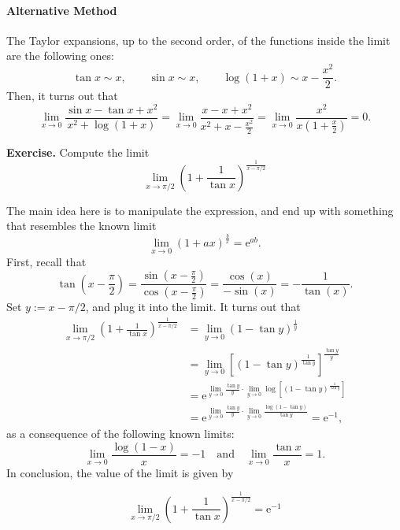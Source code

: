 \documentclass[a4paper,10 pt]{report}
\newcommand{\finalanswer}[1]{%
    \begin{finalAnswer}
    \[
        #1
    \]
    \end{finalAnswer}
}
\theoremstyle{definition}
\begin{document}
\begin{solutionBox}
\paragraph{Alternative Method} The Taylor expansions, up to the second order, of the functions inside the limit are the following ones:
\begin{equation*}  \tan x \sim x, \qquad \sin x \sim x, \qquad  \log(1 + x) \sim x - \frac{x^2}{2}. \end{equation*}
Then, it turns out that
\begin{equation*}  \lim_{x \to 0} \frac{\sin x - \tan x + x^2}{x^2 + \log(1 + x)} = \lim_{x \to 0} \frac{x - x + x^2}{x^2 + x - \frac{x^2}{2}} = \lim_{x \to 0} \frac{x^2}{x(1 + \frac{x}{2})} = 0. \end{equation*}
\end{solutionBox}


\begin{exerciseBox}\textbf{Exercise.} Compute the limit
\[
\lim_{x \to \pi/2} \left( 1 + \frac{1}{\tan x} \right)^{ \frac{1}{x - \pi/2} }
\]
\end{exerciseBox}

\begin{solutionBox} 
The main idea here is to manipulate the expression, and end up with something that resembles the known limit
\begin{equation*} \lim_{x \to 0} \left(1 + a x \right)^{\frac{b}{x}} = \mathrm{e}^{ab}.\end{equation*}
First, recall that
\begin{equation*} \tan \left( x - \frac{\pi}{2} \right) = \frac{\sin \left( x - \frac{\pi}{2} \right)}{\cos \left( x - \frac{\pi}{2} \right)} = \frac{\cos(x)}{-\sin(x)} = - \frac{1}{\tan(x)}.\end{equation*}
Set $y := x - \pi/2$, and plug it into the limit. It turns out that
\begin{equation*} \begin{aligned} \lim_{x \to \pi/2} \left( 1 + \frac{1}{\tan x} \right)^{ \frac{1}{x - \pi/2} } & =  \lim_{y \to 0} \left( 1 - \tan y \right)^{ \frac{1}{y} }
\\ & =  \lim_{y \to 0}\left[ \left( 1 - \tan y \right)^{ \frac{1}{\tan y} } \right]^{\frac{\tan y}{y}}
\\ & = \mathrm{e}^{ \lim_{y \to 0} \frac{\tan y}{y} \cdot \lim_{y \to 0} \log\left[ \left( 1 - \tan y \right)^{ \frac{1}{\tan y} } \right]}
\\ & = \mathrm{e}^{ \lim_{y \to 0} \frac{\tan y}{y} \cdot \lim_{y \to 0} \frac{ \log \left( 1 - \tan y \right)}{\tan y}}  = \mathrm{e}^{-1}, \end{aligned} \end{equation*}
as a consequence of the following known limits:
\begin{equation*} \lim_{x \to 0} \frac{\log(1 - x)}{x} = - 1 \quad \text{and} \quad \lim_{x \to 0} \frac{\tan x}{x} = 1. \end{equation*}
In conclusion, the value of the limit is given by
\finalanswer{\lim_{x \to \pi/2} \left( 1 + \frac{1}{\tan x} \right)^{ \frac{1}{x - \pi/2} } = \mathrm{e}^{-1}}
\end{solutionBox}
\end{document}
